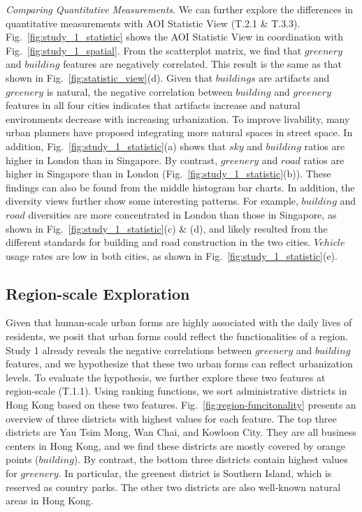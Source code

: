 \vspace*{2mm}
\noindent
\textit{Comparing Quantitative Measurements}.
We can further explore the differences in quantitative measurements with AOI Statistic View (T.2.1 \& T.3.3).
Fig.~\ref{fig:study_1_statistic} shows the AOI Statistic View in coordination with Fig.~\ref{fig:study_1_spatial}.
From the scatterplot matrix, we find that $greenery$ and $building$ features are negatively correlated.
This result is the same as that shown in Fig.~\ref{fig:statistic_view}(d).
Given that $buildings$ are artifacts and $greenery$ is natural, the negative correlation between $building$ and $greenery$ features in all four cities indicates that artifacts increase and natural environments decrease with increasing urbanization.
To improve livability, many urban planners have proposed integrating more natural spaces in street space.
In addition, Fig.~\ref{fig:study_1_statistic}(a) shows that $sky$ and $building$ ratios are higher in London than in Singapore.
By contrast, $greenery$ and $road$ ratios are higher in Singapore than in London (Fig.~\ref{fig:study_1_statistic}(b)).
These findings can also be found from the middle histogram bar charts.
In addition, the diversity views further show some interesting patterns.
For example, $building$ and $road$ diversities are more concentrated in London than those in Singapore, as shown in Fig.~\ref{fig:study_1_statistic}(c) \& (d), and likely resulted from the different standards for building and road construction in the two cities.
$Vehicle$ usage rates are low in both cities, as shown in Fig.~\ref{fig:study_1_statistic}(e). 


\subsection{Region-scale Exploration}

Given that human-scale urban forms are highly associated with the daily lives of residents, we posit that urban forms could reflect the functionalities of a region.
Study 1 already reveals the negative correlations between $greenery$ and $building$ features, and we hypothesize that these two urban forms can reflect urbanization levels.
To evaluate the hypothesis, we further explore these two features at region-scale (T.1.1).
Using ranking functions, we sort administrative districts in Hong Kong based on these two features.
Fig.~\ref{fig:region-funcitonality} presents an overview of three districts with highest values for each feature. 
The top three districts are Yau Tsim Mong, Wan Chai, and Kowloon City.
They are all business centers in Hong Kong, and we find these districts are mostly covered by orange points ($building$). 
By contrast, the bottom three districts contain highest values for $greenery$.
In particular, the greenest district is Southern Island, which is reserved as country parks.
The other two districts are also well-known natural areas in Hong Kong.
 
